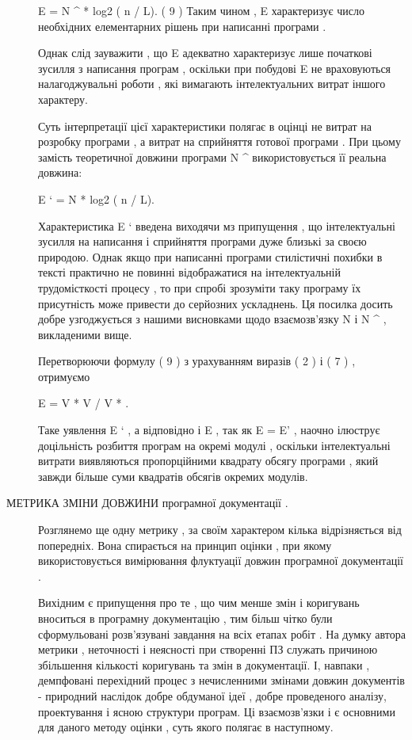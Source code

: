 \begin{description}
E = N \textasciicircum{} * log2 ( n / L). ( 9 )
Таким чином , E характеризує число необхідних елементарних рішень при написанні програми .

Однак слід зауважити , що E адекватно характеризує лише початкові зусилля з написання програм , оскільки при побудові E не враховуються налагоджувальні роботи , які вимагають інтелектуальних витрат іншого характеру.

Суть інтерпретації цієї характеристики полягає в оцінці не витрат на розробку програми , а витрат на сприйняття готової програми . При цьому замість теоретичної довжини програми N \textasciicircum{} використовується її реальна довжина:

E ` = N * log2 ( n / L).

Характеристика E ` введена виходячи мз припущення , що інтелектуальні зусилля на написання і сприйняття програми дуже близькі за своєю природою. Однак якщо при написанні програми стилістичні похибки в тексті практично не повинні відображатися на інтелектуальній трудомісткості процесу , то при спробі зрозуміти таку програму їх присутність може привести до серйозних ускладнень. Ця посилка досить добре узгоджується з нашими висновками щодо взаємозв'язку N і N \textasciicircum{} , викладеними вище.

Перетворюючи формулу ( 9 ) з урахуванням виразів ( 2 ) і ( 7 ) , отримуємо

E = V * V / V * .

Таке уявлення E ` , а відповідно і E , так як E = E' , наочно ілюструє доцільність розбиття програм на окремі модулі , оскільки інтелектуальні витрати виявляються пропорційними квадрату обсягу програми , який завжди більше суми квадратів обсягів окремих модулів.

\item[{МЕТРИКА ЗМІНИ ДОВЖИНИ програмної документації .}] \leavevmode
Розглянемо ще одну метрику , за своїм характером кілька відрізняється від попередніх. Вона спирається на принцип оцінки , при якому використовується вимірювання флуктуації довжин програмної документації .

Вихідним є припущення про те , що чим менше змін і коригувань вноситься в програмну документацію , тим більш чітко були сформульовані розв'язувані завдання на всіх етапах робіт . На думку автора метрики , неточності і неясності при створенні ПЗ служать причиною збільшення кількості коригувань та змін в документації. І, навпаки , демпфовані перехідний процес з нечисленними змінами довжин документів - природний наслідок добре обдуманої ідеї , добре проведеного аналізу, проектування і ясною структури програм. Ці взаємозв'язки і є основними для даного методу оцінки , суть якого полягає в наступному.


\end{description}
